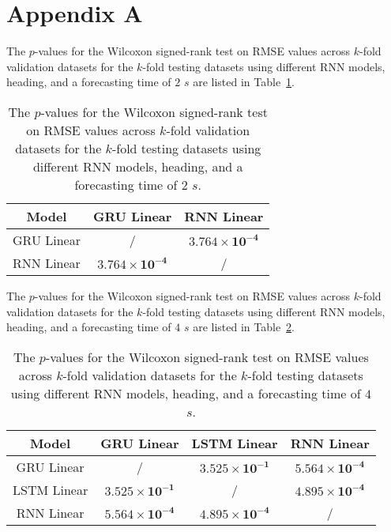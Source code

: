\appendix
\section{Appendix A}
\label{appA}

The $p$-values for the Wilcoxon signed-rank test on RMSE values across $k$-fold validation datasets for the $k$-fold testing datasets using different RNN models, heading, and a forecasting time of $2$ $s$ are listed in Table~\ref{tab:RMSE:direction:p:2}.

\begin{table}[!ht]
	\centering
	\begin{tabular}{|c|c|c|}
		\hline
		Model & GRU Linear & RNN Linear \\ \hline
		GRU Linear & / & $\mathbf{3.764 \times 10^{-4}}$ \\ \hline
		RNN Linear & $\mathbf{3.764 \times 10^{-4}}$ & / \\ \hline
	\end{tabular}
	\caption{The $p$-values for the Wilcoxon signed-rank test on RMSE values across $k$-fold validation datasets for the $k$-fold testing datasets using different RNN models, heading, and a forecasting time of $2$ $s$.}
	\label{tab:RMSE:direction:p:2}
\end{table}

The $p$-values for the Wilcoxon signed-rank test on RMSE values across $k$-fold validation datasets for the $k$-fold testing datasets using different RNN models, heading, and a forecasting time of $4$ $s$ are listed in Table~\ref{tab:RMSE:direction:p:4}.

\begin{table}[!ht]
	\centering
	\begin{tabular}{|c|c|c|c|}
		\hline
		Model & GRU Linear & LSTM Linear & RNN Linear \\ \hline
		GRU Linear & / & $\mathbf{3.525 \times 10^{-1}}$ & $\mathbf{5.564 \times 10^{-4}}$ \\ \hline
		LSTM Linear & $\mathbf{3.525 \times 10^{-1}}$ & / & $\mathbf{4.895 \times 10^{-4}}$ \\ \hline
		RNN Linear & $\mathbf{5.564 \times 10^{-4}}$ & $\mathbf{4.895 \times 10^{-4}}$ & / \\ \hline
	\end{tabular}
	\caption{The $p$-values for the Wilcoxon signed-rank test on RMSE values across $k$-fold validation datasets for the $k$-fold testing datasets using different RNN models, heading, and a forecasting time of $4$ $s$.}
	\label{tab:RMSE:direction:p:4}
\end{table}

